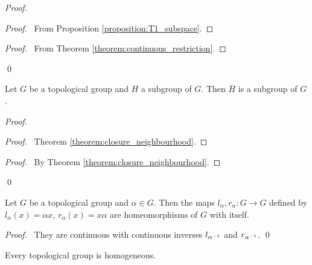 \begin{proof}
    \pf
    \begin{proof}
        \pf\ From Proposition \ref{proposition:T1_subspace}.
    \end{proof}
    \begin{proof}
        \pf\ From Theorem \ref{theorem:continuous_restriction}.
    \end{proof}
    \qed
\end{proof}

\begin{lemma}
    Let $G$ be a topological group and $H$ a subgroup of $G$. Then 
    $\overline{H}$ is a subgroup of $G$.
\end{lemma}

\begin{proof}
    \pf
    \begin{proof}
        \pf\ Theorem \ref{theorem:closure_neighbourhood}.
    \end{proof}
    \qedstep
    \begin{proof}
        \pf\ By Theorem \ref{theorem:closure_neighbourhood}.
    \end{proof}
    \qed
\end{proof}

\begin{proposition}
    Let $G$ be a topological group and $\alpha \in G$. Then the maps
    $l_\alpha, r_\alpha : G \rightarrow G$ defined by $l_\alpha(x) = \alpha x$,
    $r_\alpha(x) = x\alpha$ are homeomorphisms of $G$ with itself.
\end{proposition}

\begin{proof}
    \pf\ They are continuous with continuous inverses $l_{{\alpha}^{-1}}$ and
    $r_{{\alpha}^{-1}}$. \qed
\end{proof}

\begin{corollary}
    Every topological group is homogeneous.
\end{corollary}

